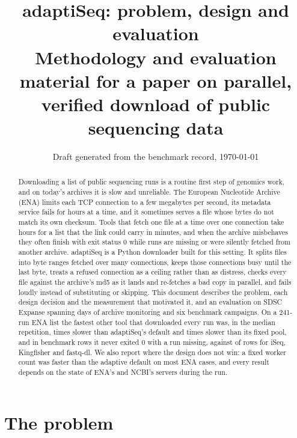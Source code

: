 \documentclass[11pt,a4paper]{article}
\title{\textbf{adaptiSeq: problem, design and evaluation}\\[2pt]
\large Methodology and evaluation material for a paper on parallel, verified download of public sequencing data}
\author{Draft generated from the benchmark record, \today}
\date{}
\begin{document}
\maketitle

\begin{abstract}
\noindent
Downloading a list of public sequencing runs is a routine first step of genomics work, and on today's
archives it is slow and unreliable. The European Nucleotide Archive (ENA) limits each TCP connection to
a few megabytes per second, its metadata service fails for hours at a time, and it sometimes serves a
file whose bytes do not match its own checksum. Tools that fetch one file at a time over one connection
take hours for a list that the link could carry in minutes, and when the archive misbehaves they often
finish with exit status 0 while runs are missing or were silently fetched from another archive.
adaptiSeq is a Python downloader built for this setting. It splits files into byte ranges fetched over
many connections, keeps those connections busy until the last byte, treats a refused connection as a
ceiling rather than as distress, checks every file against the archive's md5 as it lands and re-fetches a
bad copy in parallel, and fails loudly instead of substituting or skipping. This document describes the
problem, each design decision and the measurement that motivated it, and an evaluation on SDSC Expanse
spanning \portalDays{} days of archive monitoring and six benchmark campaigns. On a 241-run ENA list the fastest
other tool that downloaded every run was, in the median repetition, \chRDefVsBestOther{} times slower than adaptiSeq's
default and \chRFixVsBestOther{} times slower than its fixed pool, and in \chAseqRows{} benchmark rows it never exited 0 with a run missing, against \chOtherSilent{} of
\chOtherRows{} rows for iSeq, Kingfisher and fastq-dl. We also report where the design does not win: a
fixed worker count was faster than the adaptive default on most ENA cases, and every result depends on the
state of ENA's and NCBI's servers during the run.
\end{abstract}

\tableofcontents
\newpage

\section{The problem}
\label{sec:problem}
\end{document}
